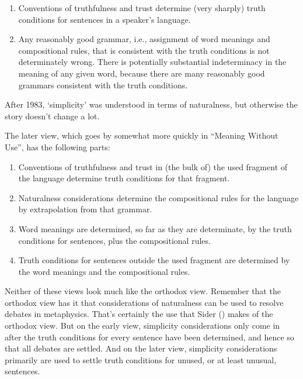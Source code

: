 \documentclass[
  10pt,
  letterpaper,
  DIV=11,
  numbers=noendperiod,
  twoside]{scrartcl}
\providecommand{\tightlist}{%
  \setlength{\itemsep}{0pt}\setlength{\parskip}{0pt}}\usepackage{longtable,booktabs,array}
\begin{document}
\begin{enumerate}
\def\labelenumi{\arabic{enumi}.}
\tightlist
\item
  Conventions of truthfulness and trust determine (very sharply) truth
  conditions for sentences in a speaker's language.
\item
  Any reasonably good grammar, i.e., assignment of word meanings and
  compositional rules, that is consistent with the truth conditions is
  not determinately wrong. There is potentially substantial
  indeterminacy in the meaning of any given word, because there are many
  reasonably good grammars consistent with the truth conditions.
\end{enumerate}

After 1983, `simplicity' was understood in terms of naturalness, but
otherwise the story doesn't change a lot.

The later view, which goes by somewhat more quickly in ``Meaning Without
Use'', has the following parts:

\begin{enumerate}
\def\labelenumi{\arabic{enumi}.}
\tightlist
\item
  Conventions of truthfulness and trust in (the bulk of) the used
  fragment of the language determine truth conditions for that fragment.
\item
  Naturalness considerations determine the compositional rules for the
  language by extrapolation from that grammar.
\item
  Word meanings are determined, so far as they are determinate, by the
  truth conditions for sentences, plus the compositional rules.
\item
  Truth conditions for sentences outside the used fragment are
  determined by the word meanings and the compositional rules.
\end{enumerate}

Neither of these views look much like the orthodox view. Remember that
the orthodox view has it that considerations of naturalness can be used
to resolve debates in metaphysics. That's certainly the use that Sider
() makes of the orthodox view. But
on the early view, simplicity considerations only come in after the
truth conditions for every sentence have been determined, and hence so
that all debates are settled. And on the later view, simplicity
considerations primarily are used to settle truth conditions for unused,
or at least unusual, sentences.
\end{document}
